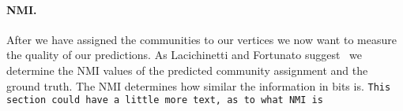 \paragraph{NMI.}
After we have assigned the communities to our vertices we now want to measure 
the quality of our predictions. As Lacichinetti and Fortunato 
suggest~\cite{LF09} we determine the NMI values of the predicted community 
assignment and the ground truth. The NMI determines how similar the 
information in bits is. \texttt{This section could have a little more text, as to what NMI is}
